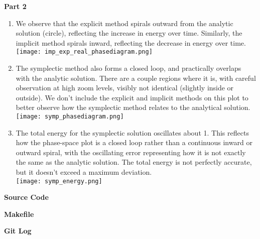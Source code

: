 \documentclass{article}
\newcommand{\9}{\left( }
\newcommand{\0}{\right) }
\begin{document}
\noindent \textbf{Part 2}
\begin{enumerate}
    \item We observe that the explicit method spirals outward from the analytic solution (circle), reflecting the increase in energy over time. Similarly, the implicit method spirals inward, reflecting the decrease in energy over time.\\
    \texttt{[image: imp\_exp\_real\_phasediagram.png]}
    
    \item The symplectic method also forms a closed loop, and practically overlaps with the analytic solution. There are a couple regions where it is, with careful observation at high zoom levels, visibly not identical (slightly inside or outside). We don't include the explicit and implicit methods on this plot to better observe how the symplectic method relates to the analytical solution.\\
    \texttt{[image: symp\_phasediagram.png]}
    
    \item The total energy for the symplectic solution oscillates about 1. This reflects how the phase-space plot is a closed loop rather than a continuous inward or outward spiral, with the oscillating error representing how it is not exactly the same as the analytic solution. The total energy is not perfectly accurate, but it doesn't exceed a maximum deviation.\\
    \texttt{[image: symp\_energy.png]}
    
    
\end{enumerate}
\noindent \textbf{Source Code}


\noindent \textbf{Makefile}


\noindent \textbf{Git Log}

\end{document}

